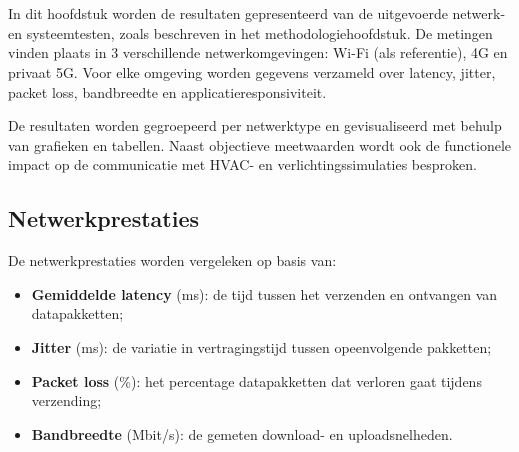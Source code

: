 \chapter{}%
\label{ch:resultaten}


In dit hoofdstuk worden de resultaten gepresenteerd van de uitgevoerde netwerk- en systeemtesten, zoals beschreven in het methodologiehoofdstuk. De metingen vinden plaats in 3 verschillende netwerkomgevingen: Wi-Fi (als referentie), 4G en privaat 5G. Voor elke omgeving worden gegevens verzameld over latency, jitter, packet loss, bandbreedte en applicatieresponsiviteit.

De resultaten worden gegroepeerd per netwerktype en gevisualiseerd met behulp van grafieken en tabellen. Naast objectieve meetwaarden wordt ook de functionele impact op de communicatie met HVAC- en verlichtingssimulaties besproken.

\section{Netwerkprestaties}

De netwerkprestaties worden vergeleken op basis van:

\begin{itemize}
    \item \textbf{Gemiddelde latency} (ms): de tijd tussen het verzenden en ontvangen van datapakketten;
    \item \textbf{Jitter} (ms): de variatie in vertragingstijd tussen opeenvolgende pakketten;
    \item \textbf{Packet loss} (\%): het percentage datapakketten dat verloren gaat tijdens verzending;
    \item \textbf{Bandbreedte} (Mbit/s): de gemeten download- en uploadsnelheden.
\end{itemize}

